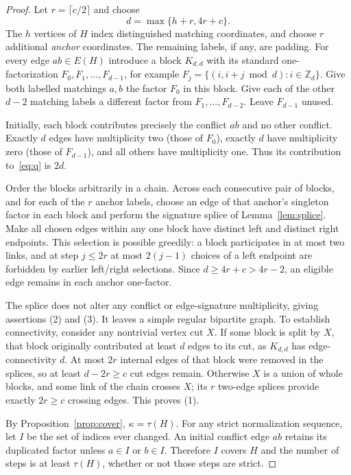 \documentclass[10pt]{article}
\begin{document}
\begin{proof}
Let $r=\lceil c/2\rceil$ and choose
\[d=\max\{h+r,4r+c\}.\]
The $h$ vertices of $H$ index distinguished matching coordinates, and choose $r$ additional \emph{anchor} coordinates. The remaining labels, if any, are padding. For every edge $ab\in E(H)$ introduce a block $K_{d,d}$ with its standard one-factorization $F_0,F_1,\ldots,F_{d-1}$, for example $F_j=\{(i,i+j\bmod d):i\in\mathbb Z_d\}$. Give both labelled matchings $a,b$ the factor $F_0$ in this block. Give each of the other $d-2$ matching labels a different factor from $F_1,\ldots,F_{d-2}$. Leave $F_{d-1}$ unused.

Initially, each block contributes precisely the conflict $ab$ and no other conflict. Exactly $d$ edges have multiplicity two (those of $F_0$), exactly $d$ have multiplicity zero (those of $F_{d-1}$), and all others have multiplicity one. Thus its contribution to~\eqref{eq:q} is $2d$.

Order the blocks arbitrarily in a chain. Across each consecutive pair of blocks, and for each of the $r$ anchor labels, choose an edge of that anchor's singleton factor in each block and perform the signature splice of Lemma~\ref{lem:splice}. Make all chosen edges within any one block have distinct left and distinct right endpoints. This selection is possible greedily: a block participates in at most two links, and at step $j\le2r$ at most $2(j-1)$ choices of a left endpoint are forbidden by earlier left/right selections. Since $d\ge4r+c>4r-2$, an eligible edge remains in each anchor one-factor.

The splice does not alter any conflict or edge-signature multiplicity, giving assertions (2) and (3). It leaves a simple regular bipartite graph. To establish connectivity, consider any nontrivial vertex cut $X$. If some block is split by $X$, that block originally contributed at least $d$ edges to its cut, as $K_{d,d}$ has edge-connectivity $d$. At most $2r$ internal edges of that block were removed in the splices, so at least $d-2r\ge c$ cut edges remain. Otherwise $X$ is a union of whole blocks, and some link of the chain crosses $X$; its $r$ two-edge splices provide exactly $2r\ge c$ crossing edges. This proves (1).

By Proposition~\ref{prop:cover}, $\kappa=\tau(H)$. For any strict normalization sequence, let $I$ be the set of indices ever changed. An initial conflict edge $ab$ retains its duplicated factor unless $a\in I$ or $b\in I$. Therefore $I$ covers $H$ and the number of steps is at least $\tau(H)$, whether or not those steps are strict.


\end{proof}
\end{document}

